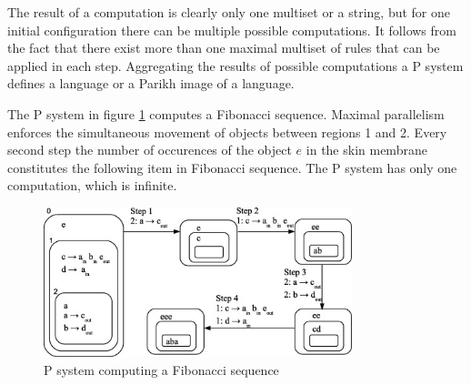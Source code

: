 The result of a computation is clearly only one multiset or a string, but for one initial configuration there can be multiple possible computations. It follows from the fact that there exist more than one maximal multiset of rules that can be applied in each step. Aggregating the results of possible computations a P system defines a language or a Parikh image of a language. 

\begin{example}
  The P system in figure \ref{fig:p_system_fibonacci} computes a Fibonacci sequence. Maximal parallelism enforces the simultaneous movement of objects between regions 1 and 2. Every second step the number of occurences of the object $e$ in the skin membrane constitutes the following item in Fibonacci sequence. The P system has only one computation, which is infinite.
\end{example}

\begin{figure}[ht]
  \centering
  \includegraphics[width=0.8\textwidth]{img/p_system_fibonacci.jpg}
  \caption{P system computing a Fibonacci sequence \cite{Buiu201233PSystemFibonacci}}
  \label{fig:p_system_fibonacci}
\end{figure}

